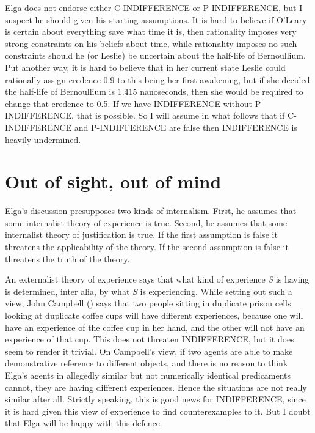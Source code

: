 \documentclass[
  11pt,
  letterpaper,
  DIV=11,
  numbers=noendperiod,
  oneside]{scrartcl}
\begin{document}
Elga does not endorse either C-INDIFFERENCE or P-INDIFFERENCE, but I
suspect he should given his starting assumptions. It is hard to believe
if O'Leary is certain about everything save what time it is, then
rationality imposes very strong constraints on his beliefs about time,
while rationality imposes no such constraints should he (or Leslie) be
uncertain about the half-life of Bernoullium. Put another way, it is
hard to believe that in her current state Leslie could rationally assign
credence 0.9 to this being her first awakening, but if she decided the
half-life of Bernoullium is 1.415 nanoseconds, then she would be
required to change that credence to 0.5. If we have INDIFFERENCE without
P-INDIFFERENCE, that is possible. So I will assume in what follows that
if C-INDIFFERENCE and P-INDIFFERENCE are false then INDIFFERENCE is
heavily undermined.

\section{Out of sight, out of mind}\label{sec-internalism}

Elga's discussion presupposes two kinds of internalism. First, he
assumes that some internalist theory of experience is true. Second, he
assumes that some internalist theory of justification is true. If the
first assumption is false it threatens the applicability of the theory.
If the second assumption is false it threatens the truth of the theory.

An externalist theory of experience says that what kind of experience
\emph{S} is having is determined, inter alia, by what \emph{S} is
experiencing. While setting out such a view, John Campbell
() says that two people
sitting in duplicate prison cells looking at duplicate coffee cups will
have different experiences, because one will have an experience of the
coffee cup in her hand, and the other will not have an experience of
that cup. This does not threaten INDIFFERENCE, but it does seem to
render it trivial. On Campbell's view, if two agents are able to make
demonstrative reference to different objects, and there is no reason to
think Elga's agents in allegedly similar but not numerically identical
predicaments cannot, they are having different experiences. Hence the
situations are not really similar after all. Strictly speaking, this is
good news for INDIFFERENCE, since it is hard given this view of
experience to find counterexamples to it. But I doubt that Elga will be
happy with this defence.
\end{document}
